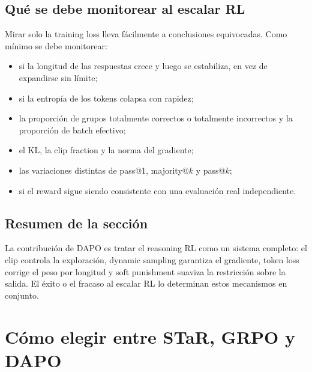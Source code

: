 \documentclass[a4paper]{article}
\begin{document}
\subsection{Qué se debe monitorear al escalar RL}


Mirar solo la training loss lleva fácilmente a conclusiones equivocadas. Como mínimo se debe monitorear:

\begin{itemize}
    \item si la longitud de las respuestas crece y luego se estabiliza, en vez de expandirse sin límite;
    \item si la entropía de los tokens colapsa con rapidez;
    \item la proporción de grupos totalmente correctos o totalmente incorrectos y la proporción de batch efectivo;
    \item el KL, la clip fraction y la norma del gradiente;
    \item las variaciones distintas de pass@1, majority@$k$ y pass@$k$;
    \item si el reward sigue siendo consistente con una evaluación real independiente.
\end{itemize}

\subsection{Resumen de la sección}

La contribución de DAPO es tratar el reasoning RL como un sistema completo: el clip controla la exploración, dynamic sampling garantiza el gradiente, token loss corrige el peso por longitud y soft punishment suaviza la restricción sobre la salida. El éxito o el fracaso al escalar RL lo determinan estos mecanismos en conjunto.

\section{Cómo elegir entre STaR, GRPO y DAPO}

\end{document}
